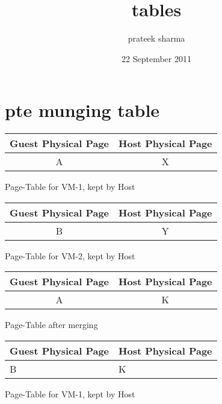 \documentclass[11pt]{article}
\begin{document}
\title{tables}
\author{prateek sharma}
\date{22 September 2011}
\maketitle

\setcounter{tocdepth}{3}
\tableofcontents
\vspace*{1cm}
\section{pte munging table}
\label{sec-1}



\begin{center}
\begin{tabular}{|c|c|}
 Guest Physical Page  &  Host Physical Page  \\
\hline
 A                    &  X                   \\
\hline
\end{tabular}
\caption{Page-Table for VM-1, kept by Host}
\end{center}





\begin{center}
\begin{tabular}{|c|c|}
 Guest Physical Page  &  Host Physical Page  \\
\hline
 B                    &  Y                   \\
\hline
\end{tabular}
\caption{Page-Table for VM-2, kept by Host}
\end{center}


\begin{center}
\begin{tabular}{|c|c|}
 Guest Physical Page  &  Host Physical Page  \\
\hline
 A                    &  K                   \\
\hline
\end{tabular}
\caption{Page-Table after merging}
\end{center}





\begin{center}
\begin{tabular}{ll}
 Guest Physical Page  &  Host Physical Page  \\
\hline
 B                    &  K                   \\
\hline
\end{tabular}
\caption{Page-Table for VM-1, kept by Host}
\end{center}
\end{document}
